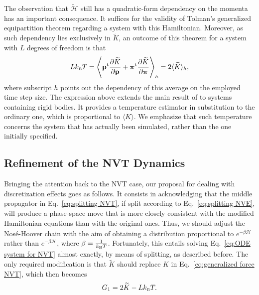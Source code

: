 \documentclass[
journal=jctcce,
layout=twocolumn
]{achemso}
\newcommand{\vt}[1]{\boldsymbol{\mathbf{#1}}}   %
\newcommand{\tr}[1]{#1^\text{t}}                %
\newcommand{\diff}[2]{\frac{\partial #1}{\partial #2}} %
\newcommand{\Ham}[1]{{\mathcal H}_\text{#1}}    %
\newcommand{\timestep}{h}
\newcommand{\refined}[1]{\widetilde{#1}}
\begin{document}
The observation that $\refined{\Ham{}}$ still has a quadratic-form dependency on the momenta has an important consequence.
It suffices for the validity of Tolman's generalized equipartition theorem \cite{Tolman_1918, Uline_2008, Eastwood_2010} regarding a system with this Hamiltonian.
Moreover, as such dependency lies exclusively in $\refined K$, an outcome of this theorem for a system with $L$ degrees of freedom is that
\begin{equation*}
\label{eq:equipartition}
L k_\text{\tiny B} T = \left\langle \tr{\vt p} \diff{\refined K}{\vt p} + \tr{\vt \pi} \diff{\refined K}{\vt \pi} \right\rangle_\timestep = 2\langle \refined{K} \rangle_\timestep,
\end{equation*}
where subscript $\timestep$ points out the dependency of this average on the employed time step size.
The expression above extends the main result of \citeauthor{Eastwood_2010} \cite{Eastwood_2010} to systems containing rigid bodies.
It provides a temperature estimator in substitution to the ordinary one, which is proportional to $\langle K \rangle$.
We emphasize that such temperature concerns the system that has actually been simulated, rather than the one initially specified.

\subsection{Refinement of the NVT Dynamics}
\label{sec:refined_method}

Bringing the attention back to the NVT case, our proposal for dealing with discretization effects goes as follows.
It consists in acknowledging that the middle propagator in Eq.~\eqref{eq:splitting NVT}, if split according to Eq.~\eqref{eq:splitting NVE}, will produce a phase-space move that is more closely consistent with the modified Hamiltonian equations than with the original ones.
Thus, we should adjust the Nos\'e-Hoover chain with the aim of obtaining a distribution proportional to $e^{-\beta \refined{\Ham{}}}$ rather than $e^{-\beta \Ham{}}$, where $\beta = \frac{1}{k_\text{\tiny B} T}$.
Fortunately, this entails solving Eq.~\eqref{eq:ODE system for NVT} almost exactly, by means of splitting, as described before.
The only required modification is that $\refined K$ should replace $K$ in Eq.~\eqref{eq:generalized force NVT}, which then becomes
\begin{equation}
\label{eq:thermostat_force}
G_1 = 2 \refined K - L k_\text{\tiny B} T.
\end{equation}
\end{document}
